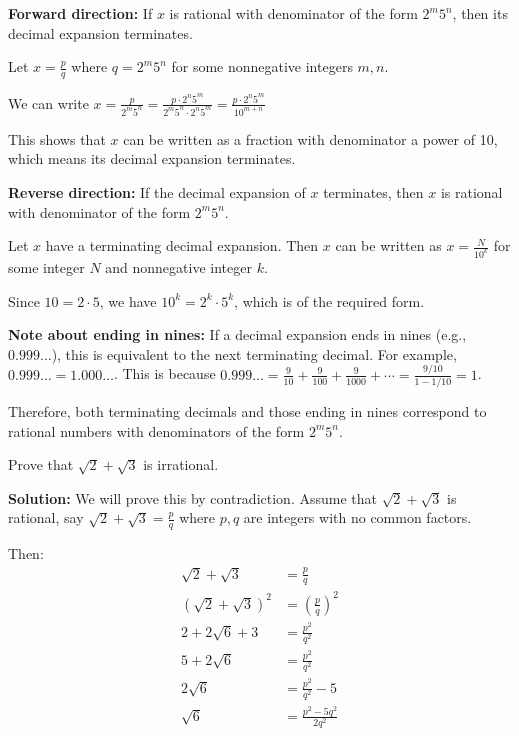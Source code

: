 \textbf{Forward direction:} If $x$ is rational with denominator of the form $2^m 5^n$, then its decimal expansion terminates.

Let $x = \frac{p}{q}$ where $q = 2^m 5^n$ for some nonnegative integers $m, n$.

We can write $x = \frac{p}{2^m 5^n} = \frac{p \cdot 2^n 5^m}{2^m 5^n \cdot 2^n 5^m} = \frac{p \cdot 2^n 5^m}{10^{m+n}}$

This shows that $x$ can be written as a fraction with denominator a power of 10, which means its decimal expansion terminates.

\textbf{Reverse direction:} If the decimal expansion of $x$ terminates, then $x$ is rational with denominator of the form $2^m 5^n$.

Let $x$ have a terminating decimal expansion. Then $x$ can be written as $x = \frac{N}{10^k}$ for some integer $N$ and nonnegative integer $k$.

Since $10 = 2 \cdot 5$, we have $10^k = 2^k \cdot 5^k$, which is of the required form.

\textbf{Note about ending in nines:}
If a decimal expansion ends in nines (e.g., $0.999\ldots$), this is equivalent to the next terminating decimal. For example, $0.999\ldots = 1.000\ldots$. This is because $0.999\ldots = \frac{9}{10} + \frac{9}{100} + \frac{9}{1000} + \cdots = \frac{9/10}{1 - 1/10} = 1$.

Therefore, both terminating decimals and those ending in nines correspond to rational numbers with denominators of the form $2^m 5^n$.

\begin{problembox}
Prove that $\sqrt{2} + \sqrt{3}$ is irrational.
\end{problembox}

\textbf{Solution:}
We will prove this by contradiction. Assume that $\sqrt{2} + \sqrt{3}$ is rational, say $\sqrt{2} + \sqrt{3} = \frac{p}{q}$ where $p, q$ are integers with no common factors.

Then:
\begin{align*}
\sqrt{2} + \sqrt{3} &= \frac{p}{q} \\
(\sqrt{2} + \sqrt{3})^2 &= \left(\frac{p}{q}\right)^2 \\
2 + 2\sqrt{6} + 3 &= \frac{p^2}{q^2} \\
5 + 2\sqrt{6} &= \frac{p^2}{q^2} \\
2\sqrt{6} &= \frac{p^2}{q^2} - 5 \\
\sqrt{6} &= \frac{p^2 - 5q^2}{2q^2}
\end{align*}

